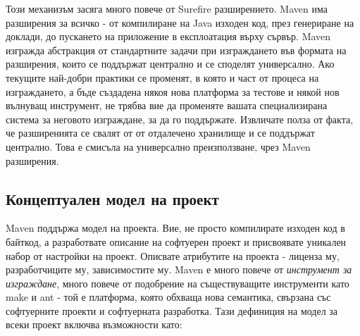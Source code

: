 Този механизъм засяга много повече от Surefire разширението. Maven има
разширения за всичко - от компилиране на Java изходен код, през
генериране на доклади, до пускането на приложение в експлоатация върху
сървър. Maven изгражда абстракция от стандартните задачи при
изграждането във формата на разширения, които се поддържат централно и
се споделят универсално. Ако текущите най-добри практики се променят,
в която и част от процеса на изграждането, а бъде създадена някоя нова
платформа за тестове и някой нов вълнуващ инструмент, не трябва вие да
променяте вашата специализирана система за неговото изграждане, за да
го поддържате. Извличате полза от факта, че разширенията се свалят от
от отдалечено хранилище и се поддържат централно. Това е смисъла на
универсално преизползване, чрез Maven разширения.   
\subsection{Концептуален модел на проект}
Maven поддържа модел на проекта. Вие, не просто компилирате изходен код
в байткод, а разработвате описание на софтуерен проект и присвоявате
уникален набор от настройки на проект. Описвате атрибутите на проекта
- лиценза му, разработчиците му, зависимостите му. Maven е много
повече от \emph{инструмент за изграждане}, много повече от подобрение
на съществуващите инструменти като make и ant - той е платформа, която
обхваща нова семантика, свързана със софтуерните проекти и софтуерната
разработка. Тази дефиниция на модел за всеки проект включва
възможности като:
